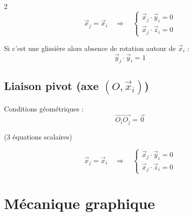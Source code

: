 \documentclass[10pt,a4paper]{article}
\renewcommand{\vec}{\overrightarrow}
\begin{document}
\begin{multicols}{2}
        \[
        \vec x_j = \vec x_i
        \quad \Rightarrow \quad
        \begin{cases}
        \vec x_j \cdot \vec y_i = 0 \\
        \vec x_j \cdot \vec z_i = 0
        \end{cases}
        \]

        Si c'est une glissière alors absence de rotation autour de $\vec x_i$ :
        \[
        \vec y_j \cdot \vec y_i = 1
        \]

    \subsection{Liaison pivot (axe $(O,\vec x_i)$)}

        Conditions géométriques :
        \[
        \vec{O_iO_j} = \vec 0
        \]

        (3 équations scalaires)

        \[
        \vec x_j = \vec x_i
        \quad \Rightarrow \quad
        \begin{cases}
        \vec x_j \cdot \vec y_i = 0 \\
        \vec x_j \cdot \vec z_i = 0
        \end{cases}
        \]

    \end{multicols}

    \section{Mécanique graphique}
\end{document}
